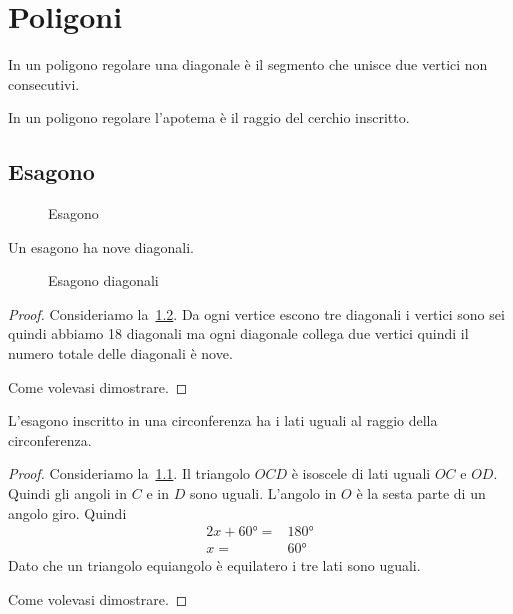 \chapter{Poligoni}\label{ch:poligoni}
\begin{defn}[Diagonali]\label{defn:poligonidiagonale}
In un poligono regolare una diagonale è il segmento che unisce due vertici non consecutivi.
\end{defn}
\begin{defn}[Apotema]\label{defn:poligoniapotema}
	In un poligono regolare l'apotema è il raggio del cerchio inscritto.
\end{defn}
\section{Esagono}\label{sec:esagono }
\begin{figure}
	\centering
	
	\caption{Esagono}
	\label{fig:esagono1}
\end{figure}
\begin{thm}[Diagonali]
	Un esagono ha nove diagonali.
\end{thm}
\begin{figure}
	\centering
	
	\caption{Esagono diagonali}
	\label{fig:esagonodiagonali}
\end{figure}
\begin{proof}
	Consideriamo la~\cref{fig:esagonodiagonali}. Da ogni vertice escono tre diagonali i vertici sono sei quindi abbiamo \num{18} diagonali ma ogni diagonale collega due vertici quindi il numero totale delle diagonali è nove. 
	
	Come volevasi dimostrare.
\end{proof}
\begin{thm}\label{thm:latoesagonoinscritto}
	L'esagono inscritto in una circonferenza ha i lati uguali al raggio della circonferenza.
\end{thm}
\begin{proof}
	Consideriamo la~\cref{fig:esagono1}. Il triangolo $OCD$ è isoscele di lati uguali $OC$ e $OD$. Quindi gli angoli in $C$ e in $D$ sono uguali. L'angolo in $O$ è la sesta parte di un angolo giro. Quindi
	\begin{align*} 
		2x+\ang{60}=&\ang{180}\\
		x=&\ang{60}
	\end{align*} 
Dato che un triangolo equiangolo è equilatero i tre lati sono uguali.

Come volevasi dimostrare.
\end{proof}
